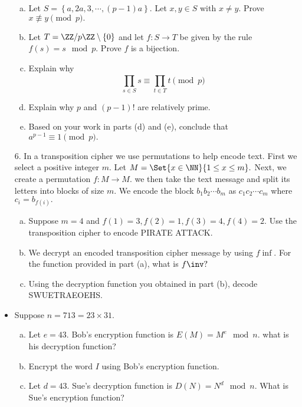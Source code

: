 \documentclass{article}
\begin{document}
\begin{itemize}
\begin{enumerate}[(a)]
			\item Let $S=\left\{ a, 2a, 3, \cdots, (p-1)a \right\}.$ Let $x, y\in S$ with $x\neq y.$ Prove $x\not\equiv y\pmod p.$

			\item Let $T=\ZZ/p\ZZ\setminus\left\{ 0 \right\}$ and let $f:S\to T$ be given by the rule $f(s)=s\mod p.$ Prove $f$ is a bijection.

			\item Explain why
				\[\prod_{s\in S}^{}s \equiv \prod_{t\in T}^{} t\pmod p\]

			\item Explain why $p$ and $(p-1)!$ are relatively prime.

			\item Based on your work in parts (d) and (e), conclude that $a^{p-1}\equiv 1\pmod p.$
				
		\end{enumerate}

	\item[6.] In a transposition cipher we use permutations to help encode text. First we select a positive integer $m.$ Let $M=\Set{x\in\NN}{1\le x\le m}.$ Next, we create a permutation $f:M\to M.$ we then take the text message and split its letters into blocks of size $m.$ We encode the block $b_1b_2\cdots b_m$ as $c_1c_2\cdots c_m$ where $c_i=b_{f(i)}.$ 
		\begin{enumerate}[(a)]
			\item Suppose $m=4$ and $f(1)=3, f(2)=1, f(3)=4, f(4)=2.$ Use the transposition cipher to encode PIRATE ATTACK.

			\item We decrypt an encoded transposition cipher message by using $f\inf.$ For the function provided in part (a), what is $f\inv?$

			\item Using the decryption function you obtained in part (b), decode SWUETRAEOEHS.
				
		\end{enumerate}

	\item Suppose $n=713=23\times 31.$
		\begin{enumerate}[(a)]
			\item Let $e=43.$ Bob's encryption function is $E(M)=M^e\mod n.$ what is his decryption function?

			\item Encrypt the word $I$ using Bob's encryption function.

			\item Let $d=43.$ Sue's decryption function is $D(N)=N^d\mod n.$ What is Sue's encryption function?
				
		\end{enumerate}
		
\end{itemize}
\end{document}
